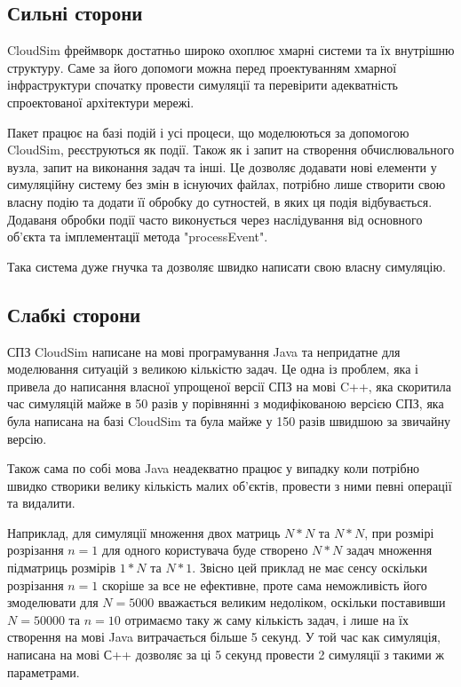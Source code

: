 \subsection{Сильні сторони}

CloudSim фреймворк \cite{CloudSim} достатньо широко охоплює хмарні системи та їх внутрішню структуру. Саме за його допомоги можна перед проектуванням хмарної інфраструктури спочатку провести симуляції та перевірити адекватність спроектованої архітектури мережі.

Пакет працює на базі подій і усі процеси, що моделюються за допомогою CloudSim, реєструються як події. Також як і запит на створення обчислювального вузла, запит на виконання задач та інші. Це дозволяє додавати нові елементи у симуляційну систему без змін в існуючих файлах, потрібно лише створити свою власну подію та додати її обробку до сутностей, в яких ця подія відбувається. Додаваня обробки події часто виконується через наслідування від основного об'єкта та імплементації метода "processEvent".

Така система дуже гнучка та дозволяє швидко написати свою власну симуляцію.

\subsection{Слабкі сторони}

СПЗ CloudSim написане на мові програмування Java та непридатне для моделювання ситуацій з великою кількістю задач. Це одна із проблем, яка і привела до написання власної упрощеної версії СПЗ на мові C++, яка скоритила час симуляцій майже в 50 разів у порівнянні з модифікованою версією СПЗ, яка була написана на базі CloudSim та була майже у 150 разів швидшою за звичайну версію.

Також сама по собі мова Java неадекватно працює у випадку коли потрібно швидко створики велику кількість малих об'єктів, провести з ними певні операції та видалити.

Наприклад, для симуляції множення двох матриць $N*N$ та $N*N$, при розмірі розрізання $n=1$ для одного користувача буде створено $N*N$ задач множення підматриць розмірів $1*N$ та $N*1$. Звісно цей приклад не має сенсу оскільки розрізання $n=1$ скоріше за все не ефективне, проте сама неможливість його змоделювати для $N=5000$ вважається великим недоліком, оскільки поставивши $N=50000$ та $n=10$ отримаємо таку ж саму кількість задач, і лише на їх створення на мові Java витрачається більше 5 секунд. У той час как симуляція, написана на мові С++ дозволяє за ці 5 секунд провести 2 симуляції з такими ж параметрами.

